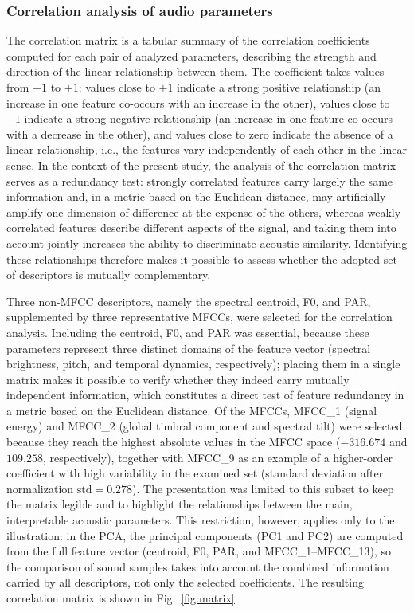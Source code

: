 \documentclass{article}
\begin{document}
\subsubsection{Correlation analysis of audio parameters}
The correlation matrix is a tabular summary of the correlation coefficients computed for each pair of analyzed parameters, describing the strength and direction of the linear relationship between them. The coefficient takes values from $-1$ to $+1$: values close to $+1$ indicate a strong positive relationship (an increase in one feature co-occurs with an increase in the other), values close to $-1$ indicate a strong negative relationship (an increase in one feature co-occurs with a decrease in the other), and values close to zero indicate the absence of a linear relationship, i.e., the features vary independently of each other in the linear sense. In the context of the present study, the analysis of the correlation matrix serves as a redundancy test: strongly correlated features carry largely the same information and, in a metric based on the Euclidean distance, may artificially amplify one dimension of difference at the expense of the others, whereas weakly correlated features describe different aspects of the signal, and taking them into account jointly increases the ability to discriminate acoustic similarity. Identifying these relationships therefore makes it possible to assess whether the adopted set of descriptors is mutually complementary.


Three non-MFCC descriptors, namely the spectral centroid, F0, and PAR, supplemented by three representative MFCCs, were selected for the correlation analysis. Including the centroid, F0, and PAR was essential, because these parameters represent three distinct domains of the feature vector (spectral brightness, pitch, and temporal dynamics, respectively); placing them in a single matrix makes it possible to verify whether they indeed carry mutually independent information, which constitutes a direct test of feature redundancy in a metric based on the Euclidean distance. Of the MFCCs, MFCC\_1 (signal energy) and MFCC\_2 (global timbral component and spectral tilt) were selected because they reach the highest absolute values in the MFCC space ($-316.674$ and $109.258$, respectively), together with MFCC\_9 as an example of a higher-order coefficient with high variability in the examined set (standard deviation after normalization $\text{std} = 0.278$). The presentation was limited to this subset to keep the matrix legible and to highlight the relationships between the main, interpretable acoustic parameters. This restriction, however, applies only to the illustration: in the PCA, the principal components (PC1 and PC2) are computed from the full feature vector (centroid, F0, PAR, and MFCC\_1--MFCC\_13), so the comparison of sound samples takes into account the combined information carried by all descriptors, not only the selected coefficients. The resulting correlation matrix is shown in Fig.~\ref{fig:matrix}.
\end{document}
